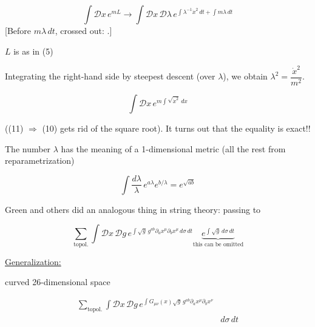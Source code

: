 
\begin{equation*}
\int \mathcal{D}x\,e^{mL}
\longrightarrow
\int \mathcal{D}x\,\mathcal{D}\lambda\,
e^{\int \lambda^{-1}\dot{x}^{2}\,dt+\int m\lambda\,dt}
\tag{10}
\end{equation*}
[Before $m\lambda\,dt$, crossed out:
.]

$L$ is as in (5)

Integrating the right-hand side by steepest descent (over $\lambda$), we obtain
$\lambda^{2}=\dfrac{\dot{x}^{2}}{m^{2}}$.

\begin{equation*}
\int \mathcal{D}x\,e^{m\int\sqrt{\dot{x}^{2}}\,dx}
\tag{11}
\end{equation*}

((11) $\Rightarrow$ (10) gets rid of the square root). It turns out that the equality is exact!!

The number $\lambda$ has the meaning of a 1-dimensional metric
(all the rest 
from reparametrization)

\begin{equation*}
\int\frac{d\lambda}{\lambda}\,e^{a\lambda}e^{b/\lambda}
=e^{\sqrt{ab}}
\tag{12}
\end{equation*}

Green and others did an analogous thing in string theory: passing to

\begin{equation*}
\sum_{\text{topol.}}\int\mathcal{D}x\,\mathcal{D}g\,
e^{\int\sqrt{g}\,g^{ab}\partial_a x^{\mu}\partial_b x^{\mu}\,d\sigma\,dt}
\underbrace{e^{\int\sqrt{g}\,d\sigma\,dt}}_{\text{this can be omitted}}
\tag{13}
\end{equation*}

\underline{Generalization:}

curved 26-dimensional space

\begin{equation*}
\begin{aligned}
\sum_{\text{topol.}}\int\mathcal{D}x\,\mathcal{D}g\,
e^{\int G_{\mu\nu}(x)\sqrt{g}\,g^{ab}\partial_a x^{\mu}\partial_b x^{\nu}}
&{}\\
&d\sigma\,dt
\end{aligned}
\tag{14}
\end{equation*}

